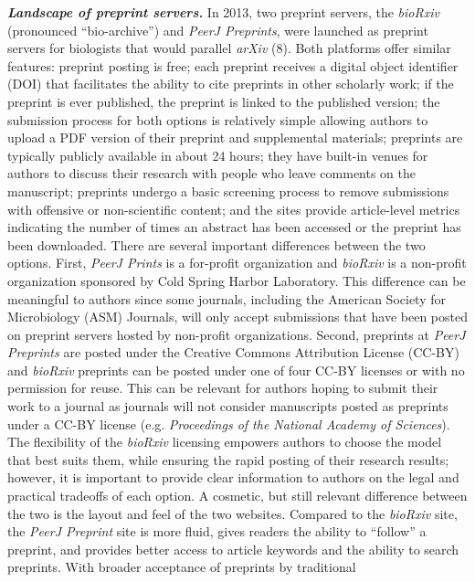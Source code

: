 \documentclass[11pt,]{article}
\begin{document}
\textbf{\emph{Landscape of preprint servers.}} In 2013, two preprint
servers, the \emph{bioRxiv} (pronounced ``bio-archive'') and \emph{PeerJ
Preprints}, were launched as preprint servers for biologists that would
parallel \emph{arXiv} (8). Both platforms offer similar features:
preprint posting is free; each preprint receives a digital object
identifier (DOI) that facilitates the ability to cite preprints in other
scholarly work; if the preprint is ever published, the preprint is
linked to the published version; the submission process for both options
is relatively simple allowing authors to upload a PDF version of their
preprint and supplemental materials; preprints are typically publicly
available in about 24 hours; they have built-in venues for authors to
discuss their research with people who leave comments on the manuscript;
preprints undergo a basic screening process to remove submissions with
offensive or non-scientific content; and the sites provide article-level
metrics indicating the number of times an abstract has been accessed or
the preprint has been downloaded. There are several important
differences between the two options. First, \emph{PeerJ Prints} is a
for-profit organization and \emph{bioRxiv} is a non-profit organization
sponsored by Cold Spring Harbor Laboratory. This difference can be
meaningful to authors since some journals, including the American
Society for Microbiology (ASM) Journals, will only accept submissions
that have been posted on preprint servers hosted by non-profit
organizations. Second, preprints at \emph{PeerJ Preprints} are posted
under the Creative Commons Attribution License (CC-BY) and
\emph{bioRxiv} preprints can be posted under one of four CC-BY licenses
or with no permission for reuse. This can be relevant for authors hoping
to submit their work to a journal as journals will not consider
manuscripts posted as preprints under a CC-BY license (e.g.
\emph{Proceedings of the National Academy of Sciences}). The flexibility
of the \emph{bioRxiv} licensing empowers authors to choose the model
that best suits them, while ensuring the rapid posting of their research
results; however, it is important to provide clear information to
authors on the legal and practical tradeoffs of each option. A cosmetic,
but still relevant difference between the two is the layout and feel of
the two websites. Compared to the \emph{bioRxiv} site, the \emph{PeerJ
Preprint} site is more fluid, gives readers the ability to ``follow'' a
preprint, and provides better access to article keywords and the ability
to search preprints. With broader acceptance of preprints by traditional
\end{document}
